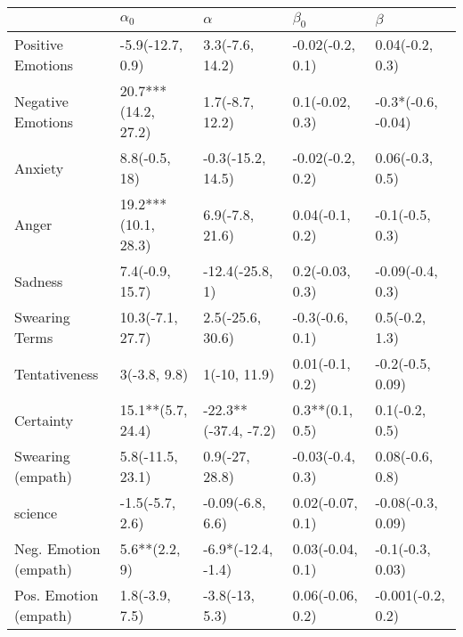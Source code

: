 \begin{tabular}{lllll}
\toprule
{} &           $\alpha_0$ &              $\alpha$ &         $\beta_0$ &             $\beta$ \\
\midrule
Positive Emotions     &     -5.9(-12.7, 0.9) &       3.3(-7.6, 14.2) &  -0.02(-0.2, 0.1) &     0.04(-0.2, 0.3) \\
Negative Emotions     &  20.7***(14.2, 27.2) &       1.7(-8.7, 12.2) &   0.1(-0.02, 0.3) &  -0.3*(-0.6, -0.04) \\
Anxiety               &        8.8(-0.5, 18) &     -0.3(-15.2, 14.5) &  -0.02(-0.2, 0.2) &     0.06(-0.3, 0.5) \\
Anger                 &  19.2***(10.1, 28.3) &       6.9(-7.8, 21.6) &   0.04(-0.1, 0.2) &     -0.1(-0.5, 0.3) \\
Sadness               &      7.4(-0.9, 15.7) &       -12.4(-25.8, 1) &   0.2(-0.03, 0.3) &    -0.09(-0.4, 0.3) \\
Swearing Terms        &     10.3(-7.1, 27.7) &      2.5(-25.6, 30.6) &   -0.3(-0.6, 0.1) &      0.5(-0.2, 1.3) \\
Tentativeness         &         3(-3.8, 9.8) &          1(-10, 11.9) &   0.01(-0.1, 0.2) &    -0.2(-0.5, 0.09) \\
Certainty             &    15.1**(5.7, 24.4) &  -22.3**(-37.4, -7.2) &   0.3**(0.1, 0.5) &      0.1(-0.2, 0.5) \\
Swearing (empath)     &     5.8(-11.5, 23.1) &        0.9(-27, 28.8) &  -0.03(-0.4, 0.3) &     0.08(-0.6, 0.8) \\
science               &      -1.5(-5.7, 2.6) &      -0.09(-6.8, 6.6) &  0.02(-0.07, 0.1) &   -0.08(-0.3, 0.09) \\
Neg. Emotion (empath) &        5.6**(2.2, 9) &    -6.9*(-12.4, -1.4) &  0.03(-0.04, 0.1) &    -0.1(-0.3, 0.03) \\
Pos. Emotion (empath) &       1.8(-3.9, 7.5) &        -3.8(-13, 5.3) &  0.06(-0.06, 0.2) &   -0.001(-0.2, 0.2) \\
\bottomrule
\end{tabular}
